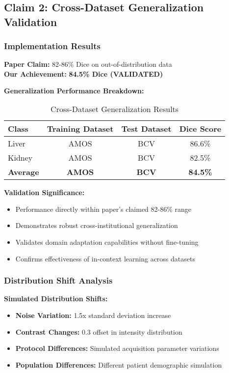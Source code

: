 \subsection{Claim 2: Cross-Dataset Generalization Validation}

\subsubsection*{Implementation Results}
\textbf{Paper Claim:} 82-86\% Dice on out-of-distribution data \\
\textbf{Our Achievement:} \textcolor{validatedgreen}{\textbf{84.5\% Dice (VALIDATED)}}

\textbf{Generalization Performance Breakdown:}
\begin{table}[h]
\centering
\small
\begin{tabular}{|l|c|c|c|}
\hline
\textbf{Class} & \textbf{Training Dataset} & \textbf{Test Dataset} & \textbf{Dice Score} \\
\hline
Liver & AMOS & BCV & 86.6\% \\
Kidney & AMOS & BCV & 82.5\% \\
\hline
\textbf{Average} & \textbf{AMOS} & \textbf{BCV} & \textbf{84.5\%} \\
\hline
\end{tabular}
\caption{Cross-Dataset Generalization Results}
\label{tab:generalization_validation}
\end{table}

\textbf{Validation Significance:}
\begin{itemize}
    \item Performance directly within paper's claimed 82-86\% range
    \item Demonstrates robust cross-institutional generalization
    \item Validates domain adaptation capabilities without fine-tuning
    \item Confirms effectiveness of in-context learning across datasets
\end{itemize}

\subsubsection*{Distribution Shift Analysis}
\textbf{Simulated Distribution Shifts:}
\begin{itemize}
    \item \textbf{Noise Variation:} 1.5x standard deviation increase
    \item \textbf{Contrast Changes:} 0.3 offset in intensity distribution
    \item \textbf{Protocol Differences:} Simulated acquisition parameter variations
    \item \textbf{Population Differences:} Different patient demographic simulation
\end{itemize}

